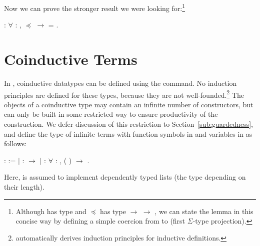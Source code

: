 Now we can prove the stronger result we were looking for:\footnote{Although
  \coqdocvariable{\ensuremath{\alpha}} has type
   and $\preceq$
  has type  $\rightarrow$
   $\rightarrow$ ,
  we can state the lemma in this concise way by defining a simple coercion
  from  to
   (first $\Sigma$-type
  projection).}
\begin{singlespace}
\begin{coqdoccode}
\coqdocnoindent
{}
:
\ensuremath{\forall} \coqdocvar{\ensuremath{\alpha}} :
,
\coqdocvariable{\ensuremath{\alpha}} \ensuremath{\preceq}
\ensuremath{\rightarrow}
\coqdocvariable{\ensuremath{\alpha}} =
.\coqdoceol
\end{coqdoccode}
\end{singlespace}


\section{Coinductive Terms}

In \Coq, coinductive datatypes can be defined using the 
command. No induction principles are defined for these types, because they are
not well-founded.\footnote{\Coq automatically derives induction principles for
  inductive definitions.} The objects of a coinductive type may contain an
infinite number of constructors, but can only be built in some restricted way
to ensure productivity of the construction.
We defer discussion of this restriction to Section~\ref{sub:guardedness}, and
define the type  of infinite terms
with function symbols in  and variables in  as
follows:
\begin{singlespace}
\begin{coqdoccode}
\coqdocnoindent
{}  :
 :=\coqdoceol
\coqdocindent{1.00em}
\ensuremath{|}  : 
\ensuremath{\rightarrow} \coqdoceol
\coqdocindent{1.00em}
\ensuremath{|}  :
\ensuremath{\forall}  : ,
( )
\ensuremath{\rightarrow} .\coqdoceol
\end{coqdoccode}
\end{singlespace}
Here,  is assumed to
implement dependently typed lists (the type depending on their length).

